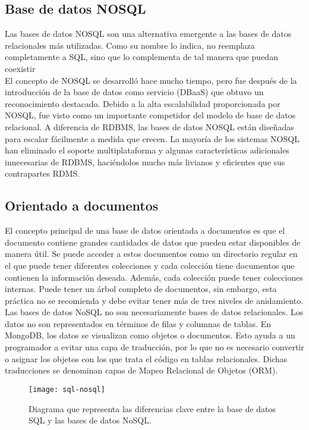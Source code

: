 \subsection{Base de datos NOSQL}
Las bases de datos NOSQL son una alternativa emergente a las bases de datos relacionales más utilizadas. Como su nombre lo indica, no reemplaza completamente a SQL, sino que lo complementa de tal manera que puedan coexistir \\[0.8cm]
El concepto de NOSQL se desarrolló hace mucho tiempo, pero fue después de la introducción de la base de datos como servicio (DBaaS) que obtuvo un reconocimiento destacado. Debido a la alta escalabilidad proporcionada por NOSQL, fue visto como un importante competidor del modelo de base de datos relacional. A diferencia de RDBMS, las bases de datos NOSQL están diseñadas para escalar fácilmente a medida que crecen. La mayoría de los sistemas NOSQL han eliminado el soporte multiplataforma y algunas características adicionales innecesarias de RDBMS, haciéndolos mucho más livianos y eficientes que sus contrapartes RDMS.
\subsection{Orientado a documentos}
El concepto principal de una base de datos orientada a documentos es que el documento contiene grandes cantidades de datos que pueden estar disponibles de manera útil. Se puede acceder a estos documentos como un directorio regular en el que puede tener diferentes colecciones y cada colección tiene documentos que contienen la información deseada. Además, cada colección puede tener colecciones internas. Puede tener un árbol completo de documentos, sin embargo, esta práctica no se recomienda y debe evitar tener más de tres niveles de anidamiento. \\[0.8cm]
Las bases de datos NoSQL no son necesariamente bases de datos relacionales. Los datos no son representados en términos de filas y columnas de tablas. En MongoDB, los datos se visualizan como objetos o documentos. Esto ayuda a un programador a evitar una capa de traducción, por lo que no es necesario convertir o asignar los objetos con los que trata el código en tablas relacionales. Dichas traducciones se denominan capas de Mapeo Relacional de Objetos (ORM).
\begin{figure}[H]
  \centering
  \texttt{[image: sql-nosql]}
  \caption{Diagrama que representa las diferencias clave entre la base de datos SQL y las bases de datos NoSQL.}
\end{figure}
